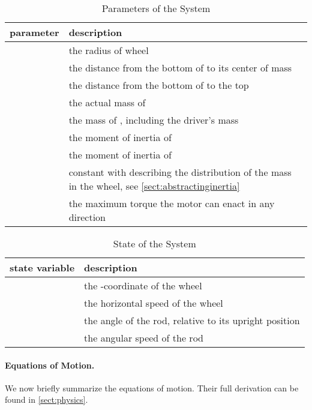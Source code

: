 \documentclass[copyright,submission]{eptcs}
\begin{document}
\begin{table}
     \centering\begin{tabu} to 0.9\linewidth {X[1]X[5]}
        \toprule
        \rowfont{\bfseries} parameter & description \\\midrule
         & the radius of wheel  \\
         & the distance from the bottom of  to its center of mass \\
         & the distance from the bottom of  to the top \\
         & the actual mass of  \\
         & the mass of , including the driver's mass \\
         & the moment of inertia of  \\
         & the moment of inertia of  \\
         & constant with  describing the distribution of the mass in the wheel, see \cref{sect:abstractinginertia} \\
         & the maximum torque the motor can enact in any direction \\
        \bottomrule
    \end{tabu}
    \caption{\label{tbl:model-parameters} Parameters of the System}
\end{table}

\begin{table}
     \centering\begin{tabu} to 0.9\linewidth {X[1.5]X[5]}
        \toprule
        \rowfont{\bfseries} state variable & description \\\midrule
         & the -coordinate of the wheel \\
         & the horizontal speed of the wheel \\
         & the angle of the rod, relative to its upright position \\
         & the angular speed of the rod \\
        \bottomrule
    \end{tabu}
    \caption{\label{tbl:model-state} State of the System}
\end{table}


\paragraph{Equations of Motion.}

We now briefly summarize the equations of motion. Their full
derivation can be found in \cref{sect:physics}.
\end{document}
